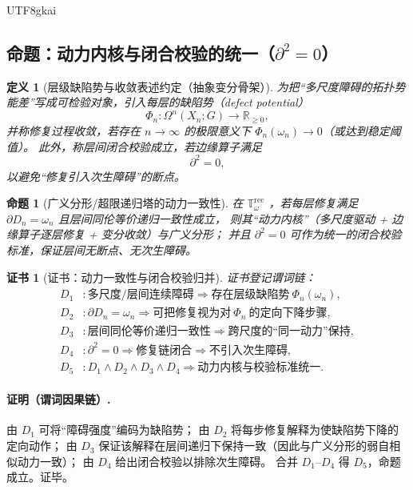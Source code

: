 \documentclass[12pt]{article}
\newtheorem{definition}{定义}[section]
\newtheorem{proposition}{命题}[section]
\newtheorem{Certificate}{证书}[section]
\newcommand{\RR}{\mathbb{R}}
\newcommand{\KouJing}{\texorpdfstring{表述约定}{表述约定}}
\begin{document}
\begin{CJK*}{UTF8}{gkai}
\subsection{命题：动力内核与闭合校验的统一（\texorpdfstring{$\partial^2=0$}{d2=0}）}
\label{subsec:tex29-dynamics-and-closure}

\begin{definition}[层级缺陷势与收敛\KouJing（抽象变分骨架）]
为把“多尺度障碍的拓扑势能差”写成可检验对象，引入每层的缺陷势（defect potential）
\[
  \Phi_n:\Omega^n(X_n;G)\to \RR_{\ge 0},
\]
并称修复过程\emph{收敛}，若存在 $n\to\infty$ 的极限意义下 $\Phi_n(\omega_n)\to 0$（或达到稳定阈值）。
此外，称\emph{层间闭合校验}成立，若边缘算子满足
\[
  \partial^2=0,
\]
以避免“修复引入次生障碍”的断点。
\end{definition}

\begin{proposition}[广义分形/超限递归塔的动力一致性]
\label{prop:tex29-dynamics-consistency}
在 $\mathbb{T}_{\omega}^{\mathrm{rec}}$ ，若每层修复满足 $\partial D_n=\omega_n$ 且层间同伦等价递归一致性成立，
则其“动力内核”（多尺度驱动 + 边缘算子逐层修复 + 变分收敛）与广义分形；
并且 $\partial^2=0$ 可作为统一的闭合校验标准，保证层间无断点、无次生障碍。
\end{proposition}

\begin{Certificate}[证书：动力一致性与闭合校验归并]
\label{cert:tex29-dynamics-consistency}
证书登记谓词链：
\[
\begin{aligned}
  D_1 &: \text{多尺度/层间连续障碍}\Rightarrow \text{存在层级缺陷势}\ \Phi_n(\omega_n),\\
  D_2 &: \partial D_n=\omega_n\Rightarrow \text{可把修复视为对}\ \Phi_n\ \text{的定向下降步骤},\\
  D_3 &: \text{层间同伦等价递归一致性}\Rightarrow \text{跨尺度的“同一动力”保持},\\
  D_4 &: \partial^2=0\Rightarrow \text{修复链闭合}\Rightarrow \text{不引入次生障碍},\\
  D_5 &: D_1\wedge D_2\wedge D_3\wedge D_4\Rightarrow \text{动力内核与校验标准统一}.
\end{aligned}
\]
\end{Certificate}

\paragraph{证明（谓词因果链）.}
由 $D_1$ 可将“障碍强度”编码为缺陷势；
由 $D_2$ 将每步修复解释为使缺陷势下降的定向动作；
由 $D_3$ 保证该解释在层间递归下保持一致（因此与广义分形的弱自相似动力一致）；
由 $D_4$ 给出闭合校验以排除次生障碍。
合并 $D_1$--$D_4$ 得 $D_5$，命题成立。证毕。


\end{CJK*}
\end{document}
